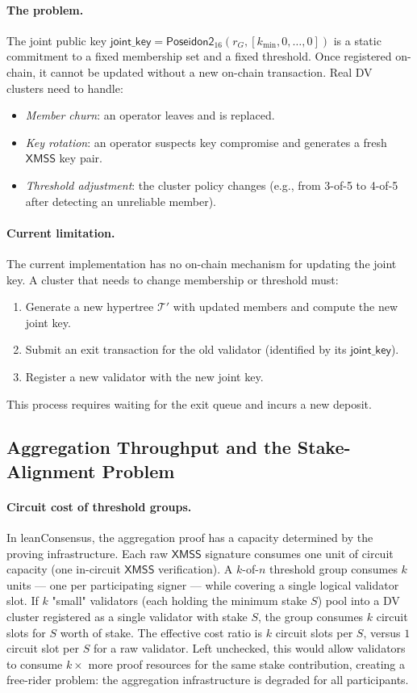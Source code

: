 \documentclass[11pt,a4paper]{article}
\newcommand{\XMSS}{\textsf{XMSS}\xspace}
\newcommand{\hypertree}{\mathcal{T}}
\newcommand{\poseidon}{\textsf{Poseidon2}\xspace}
\newcommand{\leanConsensus}{\textsf{leanConsensus}\xspace}
\begin{document}
\paragraph{The problem.}
The joint public key $\mathsf{joint\_key} = \poseidon_{16}(r_G, [k_{\min}, 0,\ldots,0])$ is a static commitment to a fixed membership set and a fixed threshold.  Once registered on-chain, it cannot be updated without a new on-chain transaction.
Real DV clusters need to handle:
\begin{itemize}
  \item \emph{Member churn}: an operator leaves and is replaced.
  \item \emph{Key rotation}: an operator suspects key compromise and generates a fresh $\XMSS$ key pair.
  \item \emph{Threshold adjustment}: the cluster policy changes (e.g., from 3-of-5 to 4-of-5 after detecting an unreliable member).
\end{itemize}

\paragraph{Current limitation.}
The current implementation has no on-chain mechanism for updating the joint key.
A cluster that needs to change membership or threshold must:
\begin{enumerate}
  \item Generate a new hypertree $\hypertree'$ with updated members and compute the new joint key.
  \item Submit an exit transaction for the old validator (identified by its $\mathsf{joint\_key}$).
  \item Register a new validator with the new joint key.
\end{enumerate}
This process requires waiting for the exit queue and incurs a new deposit.


\subsection{Aggregation Throughput and the Stake-Alignment Problem}
\label{subsec:economics}

\paragraph{Circuit cost of threshold groups.}
In \leanConsensus, the aggregation proof has a capacity determined by the proving infrastructure.
Each raw $\XMSS$ signature consumes one unit of circuit capacity (one in-circuit $\XMSS$ verification).
A $k$-of-$n$ threshold group consumes $k$ units — one per participating signer — while covering a single logical validator slot.
If $k$ "small" validators (each holding the minimum stake $S$) pool into a DV cluster registered as a single validator with stake $S$, the group consumes $k$ circuit slots for $S$ worth of stake.
The effective cost ratio is $k$ circuit slots per $S$, versus $1$ circuit slot per $S$ for a raw validator.
Left unchecked, this would allow validators to consume $k\times$ more proof resources for the same stake contribution, creating a free-rider problem: the aggregation infrastructure is degraded for all participants.
\end{document}
